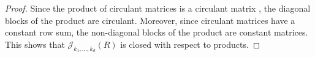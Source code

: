 \documentclass[12pt, a4paper]{amsart}
\numberwithin{equation}{section} %
\theoremstyle{plain}
\theoremstyle{definition}
\theoremstyle{plain}
\theoremstyle{remark}
\newcommand{\ones}{J}
\begin{document}
\begin{proof}
\begin{comment}
\scriptsize
\begin{equation}\label{eq:product}\begin{split}
&A\cdot B=\left(\begin{array}{c|c|c|c}
C_1 & a_{1,2}\ones & \cdots & a_{1,d}\ones \\
\hline
a_{2,1}\ones & C_2 & \cdots & a_{2,d}\ones \\
\hline
\vdots & \vdots & \ddots & \vdots \\
\hline
a_{d,1}\ones & a_{d,2}\ones & \cdots & C_d
\end{array}\right)
\cdot
\left(\begin{array}{c|c|c|c}
D_1 & b_{1,2}\ones & \cdots & b_{1,d}\ones \\
\hline
b_{2,1}\ones & D_2 & \cdots & b_{2,d}\ones \\
\hline
\vdots & \vdots & \ddots & \vdots \\
\hline
b_{d,1}\ones & b_{d,2}\ones & \cdots & D_d
\end{array}\right)=
\\
&\hspace*{-3cm}\left(\begin{array}{c|c|c|c}\displaystyle
C_1D_1+\sum_{j=2}^dk_ja_{1,j}b_{j,1}\ones & \displaystyle C_1\cdot b_{1,2}\ones+a_{1,2}\ones\cdot D_2 +\sum_{j=3}^dk_ja_{1,j}b_{j,2}\ones & \displaystyle\cdots &\displaystyle C_1\cdot b_{1,d}\ones +\sum_{j=2}^{d-1}k_ja_{1,j}b_{j,d}\ones +a_{1,d}\ones\cdot D_d \\
\hline
\displaystyle a_{2,1}\ones\cdot D_1+C_2\cdot b_{2,1}\ones+\sum_{j=3}^dk_ja_{2,j}b_{j,1}\ones & \displaystyle C_2 D_2 +\sum_{j=1,j\neq2}^dk_ja_{2,j}b_{j,2}\ones & \displaystyle\cdots &\displaystyle C_2\cdot b_{2,d}\ones +\sum_{j=1,j\neq2}^{d-1}k_ja_{2,j}b_{j,d}\ones +a_{2,d}\ones\cdot D_d 
\\
\hline
\vdots & \vdots & \ddots & \vdots 
\\
\hline
\displaystyle a_{d,1}\ones \cdot D_1 + \sum_{j=2}^{d-1}k_ja_{d,j}b_{j,1}\ones + C_d\cdot b_{d,1}\ones& \displaystyle a_{d,2}\ones\cdot D_2+\sum_{j=1,j\neq2}^{d-1}k_ja_{d,j}b_{j,2}\ones+C_d\cdot b_{d,2}\ones& \displaystyle\cdots & \displaystyle \sum_{j=1}^{d-1}k_ja_{d,j}b_{j,d}\ones + C_dD_d
\end{array}\right).
\end{split}
\end{equation}
\normalsize
\end{comment}
Since the product of circulant matrices is a circulant matrix \cite{davis}, the diagonal blocks of the product are circulant. Moreover, since circulant matrices have a constant row sum, the non-diagonal blocks of the product are constant matrices. This shows that $\mathcal{J}_{k_1,\dots,k_d}(R)$ is closed with respect to products.
\end{proof}
\end{document}
